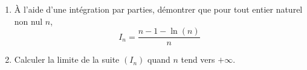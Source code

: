 \begin{enumerate}
		Recopier et compléter ce script afin qu'il réponde au problème posé.
		
		\item À l'aide d'une intégration par parties, démontrer que pour tout entier naturel non nul $n$,
		\[I_{n}=\dfrac{n-1-\ln (n)}{n}\]
		
		\item Calculer la limite de la suite $(I_{n})$ quand $n$ tend vers $+\infty$.
	\end{enumerate}
